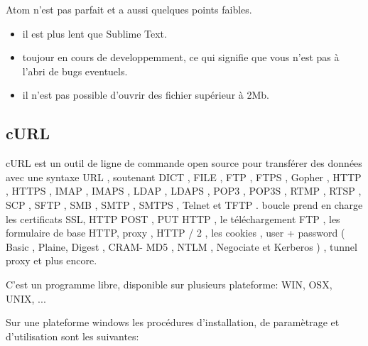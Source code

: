 Atom n'est pas parfait et a aussi quelques points faibles.
\begin{itemize}
	\item il est plus lent que Sublime Text.
	\item toujour en cours de developpemment, ce qui signifie que vous n'est pas à l'abri de bugs eventuels.
	\item il n'est pas possible d'ouvrir des fichier supérieur à 2Mb.
\end{itemize}

\subsection{cURL}
cURL est un outil de ligne de commande open source pour transférer des données avec une syntaxe URL , soutenant DICT , FILE , FTP , FTPS , Gopher , HTTP , HTTPS , IMAP , IMAPS , LDAP , LDAPS , POP3 , POP3S , RTMP , RTSP , SCP , SFTP , SMB , SMTP , SMTPS , Telnet et TFTP . boucle prend en charge les certificats SSL, HTTP POST , PUT HTTP , le téléchargement FTP , les formulaire de base HTTP, proxy , HTTP / 2 , les cookies , user + password ( Basic , Plaine, Digest , CRAM- MD5 , NTLM , Negociate et Kerberos ) , tunnel proxy et plus encore.

C'est un programme libre, disponible sur plusieurs plateforme: WIN, OSX, UNIX, ...

Sur une plateforme windows les procédures d'installation, de paramètrage et d'utilisation sont les suivantes: